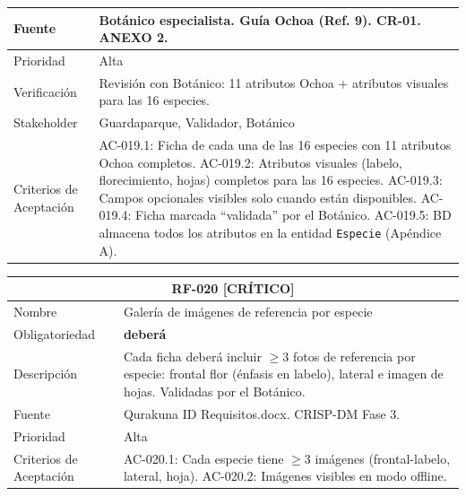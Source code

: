 \documentclass[12pt, a4paper]{article}
\newcommand{\criticomark}{\textcolor{criticolor}{\textbf{[CR\'ITICO]}}}
\begin{document}
\begin{longtable}{|p{3cm}|p{11.5cm}|}
\hline
Fuente & Bot\'anico especialista. Gu\'ia Ochoa (Ref. 9). CR-01. ANEXO 2. \\
\hline
Prioridad & Alta \\
\hline
Verificaci\'on & Revisi\'on con Bot\'anico: 11 atributos Ochoa + atributos visuales para las 16 especies. \\
\hline
Stakeholder & Guardaparque, Validador, Bot\'anico \\
\hline
Criterios de Aceptaci\'on &
AC-019.1: Ficha de cada una de las 16 especies con 11 atributos Ochoa completos. \newline
AC-019.2: Atributos visuales (labelo, florecimiento, hojas) completos para las 16 especies. \newline
AC-019.3: Campos opcionales visibles solo cuando est\'an disponibles. \newline
AC-019.4: Ficha marcada ``validada'' por el Bot\'anico. \newline
AC-019.5: BD almacena todos los atributos en la entidad \texttt{Especie} (Ap\'endice A). \\
\hline
\end{longtable}

\begin{longtable}{|p{3cm}|p{11.5cm}|}
\hline
\multicolumn{2}{|c|}{\textbf{RF-020} \criticomark} \\
\hline
Nombre & Galer\'ia de im\'agenes de referencia por especie \\
\hline
Obligatoriedad & \textbf{deber\'a} \\
\hline
Descripci\'on & Cada ficha deber\'a incluir $\geq$3 fotos de referencia por especie: frontal flor (\'enfasis en labelo), lateral e imagen de hojas. Validadas por el Bot\'anico. \\
\hline
Fuente & Qurakuna ID Requisitos.docx. CRISP-DM Fase 3. \\
\hline
Prioridad & Alta \\
\hline
Criterios de Aceptaci\'on &
AC-020.1: Cada especie tiene $\geq$3 im\'agenes (frontal-labelo, lateral, hoja). \newline
AC-020.2: Im\'agenes visibles en modo offline. \\
\hline
\end{longtable}
\end{document}
